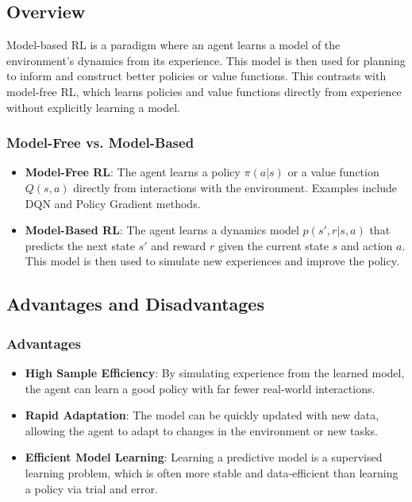 \documentclass[12pt]{article}
\begin{document}
\subsection{Overview}
Model-based RL is a paradigm where an agent learns a model of the environment's dynamics from its experience. This model is then used for planning to inform and construct better policies or value functions. This contrasts with model-free RL, which learns policies and value functions directly from experience without explicitly learning a model.

\subsubsection{Model-Free vs. Model-Based}
\begin{itemize}
    \item \textbf{Model-Free RL}: The agent learns a policy $\pi(a|s)$ or a value function $Q(s,a)$ directly from interactions with the environment. Examples include DQN and Policy Gradient methods.
    \item \textbf{Model-Based RL}: The agent learns a dynamics model $p(s', r|s, a)$ that predicts the next state $s'$ and reward $r$ given the current state $s$ and action $a$. This model is then used to simulate new experiences and improve the policy.
\end{itemize}

\subsection{Advantages and Disadvantages}
\subsubsection{Advantages}
\begin{itemize}
    \item \textbf{High Sample Efficiency}: By simulating experience from the learned model, the agent can learn a good policy with far fewer real-world interactions.
    \item \textbf{Rapid Adaptation}: The model can be quickly updated with new data, allowing the agent to adapt to changes in the environment or new tasks.
    \item \textbf{Efficient Model Learning}: Learning a predictive model is a supervised learning problem, which is often more stable and data-efficient than learning a policy via trial and error.
\end{itemize}
\end{document}
